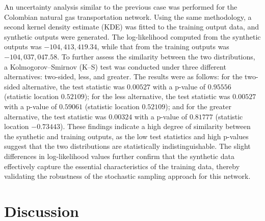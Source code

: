 An uncertainty analysis similar to the previous case was performed for the Colombian natural gas transportation network. Using the same methodology, a second kernel density estimate (KDE) was fitted to the training output data, and synthetic outputs were generated. The log-likelihood computed from the synthetic outputs was \(-104{,}413{,}419.34\), while that from the training outputs was \(-104{,}037{,}047.58\). To further assess the similarity between the two distributions, a Kolmogorov–Smirnov (K–S) test was conducted under three different alternatives: two-sided, less, and greater. The results were as follows: for the two-sided alternative, the test statistic was \(0.00527\) with a p-value of \(0.95556\) (statistic location \(0.52109\)); for the less alternative, the test statistic was \(0.00527\) with a p-value of \(0.59061\) (statistic location \(0.52109\)); and for the greater alternative, the test statistic was \(0.00324\) with a p-value of \(0.81777\) (statistic location \(-0.73443\)). These findings indicate a high degree of similarity between the synthetic and training outputs, as the low test statistics and high p-values suggest that the two distributions are statistically indistinguishable. The slight differences in log-likelihood values further confirm that the synthetic data effectively capture the essential characteristics of the training data, thereby validating the robustness of the stochastic sampling approach for this network.





\section{Discussion}


